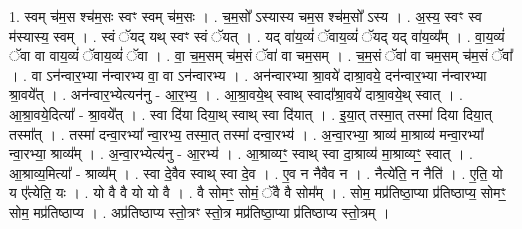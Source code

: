 \documentclass[17pt]{extarticle}
\begin{document}
1. स्वम् च॑म॒स श्च॑म॒सः स्वꣳ स्वम् च॑म॒सः । . च॒म॒सो᳚ ऽस्यास्य चम॒स श्च॑म॒सो᳚ ऽस्य । . अ॒स्य॒ स्वꣳ स्व म॑स्यास्य॒ स्वम् । . स्वं ॅयद् यथ् स्वꣳ स्वं ॅयत् । . यद् वा॑य॒व्यं॑ ॅवाय॒व्यं॑ ॅयद् यद् वा॑य॒व्य᳚म् । . वा॒य॒व्यं॑ ॅवा वा वाय॒व्यं॑ ॅवाय॒व्यं॑ ॅवा । . वा॒ च॒म॒सम् च॑म॒सं ॅवा॑ वा चम॒सम् । . च॒म॒सं ॅवा॑ वा चम॒सम् च॑म॒सं ॅवा᳚ । . वा ऽन॑न्वार॒भ्या न॑न्वारभ्य वा॒ वा ऽन॑न्वारभ्य । . अन॑न्वारभ्या श्रा॒वये॑ दाश्रा॒वये॒ दन॑न्वार॒भ्या न॑न्वारभ्या श्रा॒वये᳚त् । . अन॑न्वार॒भ्येत्यन॑नु - आ॒र॒भ्य॒ । . आ॒श्रा॒वये॒थ् स्वाथ् स्वादा᳚श्रा॒वये॑ दाश्रा॒वये॒थ् स्वात् । . आ॒श्रा॒वये॒दित्या᳚ - श्रा॒वये᳚त् । . स्वा दि॑या दिया॒थ् स्वाथ् स्वा दि॑यात् । . इ॒या॒त् तस्मा॒त् तस्मा॑ दिया दिया॒त् तस्मा᳚त् । . तस्मा॑ दन्वा॒रभ्या᳚ न्वा॒रभ्य॒ तस्मा॒त् तस्मा॑ दन्वा॒रभ्य॑ । . अ॒न्वा॒रभ्या॒ श्राव्य॑ मा॒श्राव्य॑ मन्वा॒रभ्या᳚ न्वा॒रभ्या॒ श्राव्य᳚म् । . अ॒न्वा॒रभ्येत्य॑नु - आ॒रभ्य॑ । . आ॒श्राव्यꣳ॒॒ स्वाथ् स्वा दा॒श्राव्य॑ मा॒श्राव्यꣳ॒॒ स्वात् । . आ॒श्राव्य॒मित्या᳚ - श्राव्य᳚म् । . स्वा दे॒वैव स्वाथ् स्वा दे॒व । . ए॒व न नैवैव न । . नैत्ये॑ति॒ न नैति॑ । . ए॒ति॒ यो य ए᳚त्येति॒ यः । . यो वै वै यो यो वै । . वै सोमꣳ॒॒ सोमं॒ ॅवै वै सोम᳚म् । . सोम॒ मप्र॑तिष्ठा॒प्या प्र॑तिष्ठाप्य॒ सोमꣳ॒॒ सोम॒ मप्र॑तिष्ठाप्य । . अप्र॑तिष्ठाप्य स्तो॒त्रꣳ स्तो॒त्र मप्र॑तिष्ठा॒प्या प्र॑तिष्ठाप्य स्तो॒त्रम् । \newline
\end{document}
